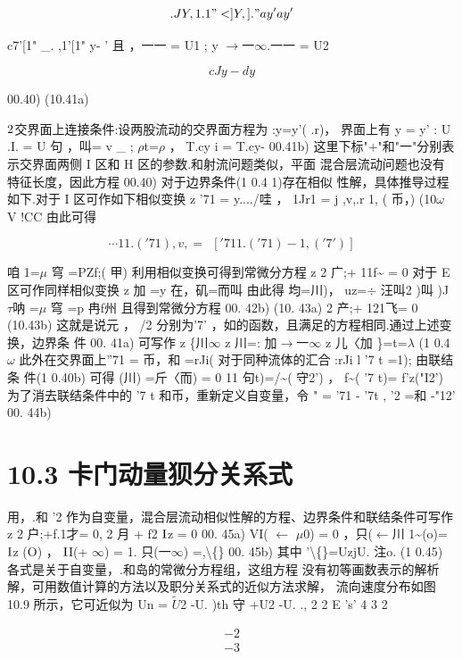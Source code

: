 \[.J Y ,1.1"<] Y ,]." a y' a y'\]

c7'[1" \_. ,1'[1" y- ' 且 ，一一 = U1 ; y $\rightarrow$一$\infty$.一一 = U2

\[cJ y - dy\]

00.40) (10.41a)

${\rm 2}$交界面上连接条件:设两股流动的交界面方程为 :y=y'( .r)， 界面上有 y = y' : U .I. = U 句 ，叫= v \_ ; $\rho$t=$\rho$ ， T.cy i = T.cy- 00.41b) 这里下标"+"和"一"分别表示交界面两侧 I 区和 H 区的参数.和射流问题类似，平面 混合层流动问题也没有特征长度，因此方程 00.40) 对于边界条件(1 0.4 1)存在相似 性解，具体推导过程如下.对于 I 区可作如下相似变换 z '71 = y..../哇 ， 1Jr1 = j ,v,.r 1, ( 币，) (10$\omega$ V !CC 由此可得

\[\cdots 11. ( '71 ) , v , = ~ ~ ['711. ( '71 ) - 1, ( '7' ) ]\]

咱 1=$\mu$ 穹 =PZf;( 甲) 利用相似变换可得到常微分方程 z 2 广;+ 11f\textasciitilde{} = 0 对于 E 区可作同样相似变换 z 加 =y 在，矶=而叫 由此得 均=川)， uz=$\div$ 汪叫2 )叫 )J $\tau$呐 =$\mu$ 穹 =p 冉f州 且得到常微分方程 00. 42b) (10. 43a) 2 产;+ 121飞= 0 (10.43b) 这就是说元 ， /2 分别为'7' ，如的函数，且满足的方程相同.通过上述变换，边界条 件 00. 41a) 可写作 z \{川$\infty$ z 川=: 加$\rightarrow$一$\infty$ z 儿〈加 \}=t=$\lambda$ (1 0.4$\omega$ 此外在交界面上''71 = 币，和 =rJi( 对于同种流体的汇合 :rJi l '7 t =1); 由联结条 件(1 0.40b) 可得 (川) =斤〈而) = 0 11 句t)=/\textasciitilde{}( 守2') ， f\textasciitilde{}( '7 t)= f'z("I2') 为了消去联结条件中的 '7 t 和币，重新定义自变量，令 " = '71 - '7t , '2 =和 -"12' 00. 44b)

\section*{10.3  卡门动量狈分关系式}

用，.和 '2 作为自变量，混合层流动相似性解的方程、边界条件和联结条件可写作 z 2 户;+f.1才= 0, 2 月 + f2 ${\rm I}$z = 0 00. 45a) VI( $\leftarrow$ $\mu$0) = 0 ，只($\leftarrow$川 1\textasciitilde{}(o)= ${\rm I}$z (O) ， ${\rm I}$I(+ $\infty$) = 1. 只(一$\infty$) =,\textbackslash\{\} 00. 45b) 其中 '\textbackslash\{\}=UzjU. 注o. (1 0.45) 各式是关于自变量，.和岛的常微分方程组，这组方程 没有初等画数表示的解析解，可用数值计算的方法以及职分关系式的近似方法求解， 流向速度分布如图 10.9 所示，它可近似为 Un = $\tilde{U}$2 -U. )th 守 +U2 -U. ., 2 2 E 's' 4 3 2

\begin{gather*}
-2\\
-3
\end{gather*}

